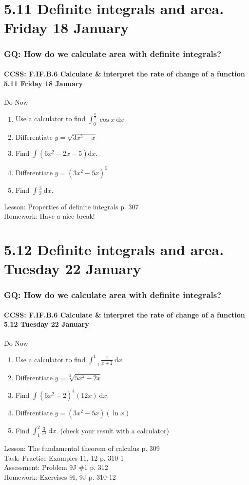 \documentclass{beamer}
\begin{document}
  \section{5.11 Definite integrals and area. Friday 18 January}
  \frame
  {
    \frametitle{GQ: How do we calculate area with definite integrals?}
    \framesubtitle{CCSS: F.IF.B.6 Calculate \& interpret the rate of change of a function  \alert{5.11 Friday 18 January}}

    \begin{block}{Do Now}
    \begin{enumerate}
        \item Use a calculator to find $\displaystyle \int_0^{\frac{\pi}{2}}{\cos x}\ \mathrm{d}x$
        \item Differentiate $y=\sqrt{3x^3-x}$
        \item Find $\int{(6x^2-2x-5)}\mathrm{d}x$.
        \item Differentiate $y={(3x^2-5x)^5}$
        \item Find $\displaystyle \int \frac{3}{x}\ \mathrm{d}x$.
    \end{enumerate}
    \end{block}
    Lesson: Properties of definite integrals p. 307\\%
    Homework: Have a nice break!
  }

  \section{5.12 Definite integrals and area. Tuesday 22 January}
  \frame
  {
    \frametitle{GQ: How do we calculate area with definite integrals?}
    \framesubtitle{CCSS: F.IF.B.6 Calculate \& interpret the rate of change of a function  \alert{5.12 Tuesday 22 January}}

    \begin{block}{Do Now}
    \begin{enumerate}
        \item Use a calculator to find $\displaystyle \int_{-1}^{1}{\frac{1}{x+2}}\ \mathrm{d}x$
        \item Differentiate $y=\sqrt[3]{5x^2-2x}$
        \item Find $\int{(6x^2-2)^4(12x)} \ \mathrm{d}x$.
        \item Differentiate $y={(3x^2-5x)(\ln x)}$
        \item Find $\displaystyle \int_1^2 \frac{3}{x^2}\ \mathrm{d}x$. (check your result with a calculator)
    \end{enumerate}
    \end{block}
    Lesson: The fundamental theorem of calculus p. 309\\%
    Task: Practice Examples 11, 12 p. 310-1\\%
    Assessment: Problem 9J \#1 p. 312 \\%
    Homework: Exercises 9I, 9J p. 310-12
  }
\end{document}
